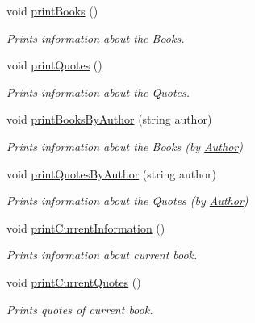\begin{DoxyCompactItemize}
void \hyperlink{class_library_a35220a3b5a4a6d9059cc4fc18ae4c0c3}{print\-Books} ()
\begin{DoxyCompactList}\small\item\em Prints information about the Books. \end{DoxyCompactList}\item 
void \hyperlink{class_library_a819acb04f4b8aea0547db50918b1c5fa}{print\-Quotes} ()
\begin{DoxyCompactList}\small\item\em Prints information about the Quotes. \end{DoxyCompactList}\item 
void \hyperlink{class_library_a6e22621933979ff5cb4e95de3f54b72c}{print\-Books\-By\-Author} (string author)
\begin{DoxyCompactList}\small\item\em Prints information about the Books (by \hyperlink{class_author}{Author}) \end{DoxyCompactList}\item 
void \hyperlink{class_library_aa13544bfe57c61164d9953518e88dcb0}{print\-Quotes\-By\-Author} (string author)
\begin{DoxyCompactList}\small\item\em Prints information about the Quotes (by \hyperlink{class_author}{Author}) \end{DoxyCompactList}\item 
void \hyperlink{class_library_a449a2d686922007674fa4a5efff89fe7}{print\-Current\-Information} ()
\begin{DoxyCompactList}\small\item\em Prints information about current book. \end{DoxyCompactList}\item 
void \hyperlink{class_library_a7be02d15c840e3d1c3ec998e204f7bf9}{print\-Current\-Quotes} ()
\begin{DoxyCompactList}\small\item\em Prints quotes of current book. \end{DoxyCompactList}\end{DoxyCompactItemize}
